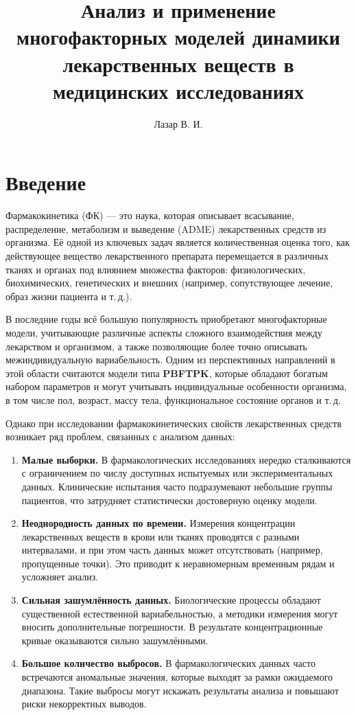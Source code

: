 \documentclass[12pt]{article}
\author{Лазар В. И.}
\title{Анализ и применение многофакторных моделей динамики лекарственных веществ в медицинских исследованиях}
\begin{document}
\maketitle

\tableofcontents

\newpage

\section{Введение}

Фармакокинетика (ФК) — это наука, которая описывает всасывание, распределение, метаболизм и выведение (ADME) лекарственных средств из организма. Её одной из ключевых задач является количественная оценка того, как действующее вещество лекарственного препарата перемещается в различных тканях и органах под влиянием множества факторов: физиологических, биохимических, генетических и внешних (например, сопутствующее лечение, образ жизни пациента и т.\,д.).

В последние годы всё большую популярность приобретают многофакторные модели, учитывающие различные аспекты сложного взаимодействия между лекарством и организмом, а также позволяющие более точно описывать межиндивидуальную вариабельность. Одним из перспективных направлений в этой области считаются модели типа \textbf{PBFTPK}\cite{macheras}, которые обладают богатым набором параметров и могут учитывать индивидуальные особенности организма, в том числе пол, возраст, массу тела, функциональное состояние органов и т.\,д.

Однако при исследовании фармакокинетических свойств лекарственных средств возникает ряд проблем, связанных с анализом данных:

\begin{enumerate}
	\item \textbf{Малые выборки.} В фармакологических исследованиях нередко сталкиваются с ограничением по числу доступных испытуемых или экспериментальных данных. Клинические испытания часто подразумевают небольшие группы пациентов, что затрудняет статистически достоверную оценку модели.

	\item \textbf{Неоднородность данных по времени.} Измерения концентрации лекарственных веществ в крови или тканях проводятся с разными интервалами, и при этом часть данных может отсутствовать (например, пропущенные точки). Это приводит к неравномерным временным рядам и усложняет анализ.

	\item \textbf{Сильная зашумлённость данных.} Биологические процессы обладают существенной естественной вариабельностью, а методики измерения могут вносить дополнительные погрешности. В результате концентрационные кривые оказываются сильно зашумлёнными.

	\item \textbf{Большое количество выбросов.} В фармакологических данных часто встречаются аномальные значения, которые выходят за рамки ожидаемого диапазона. Такие выбросы могут искажать результаты анализа и повышают риски некорректных выводов.

\end{enumerate}
\end{document}
